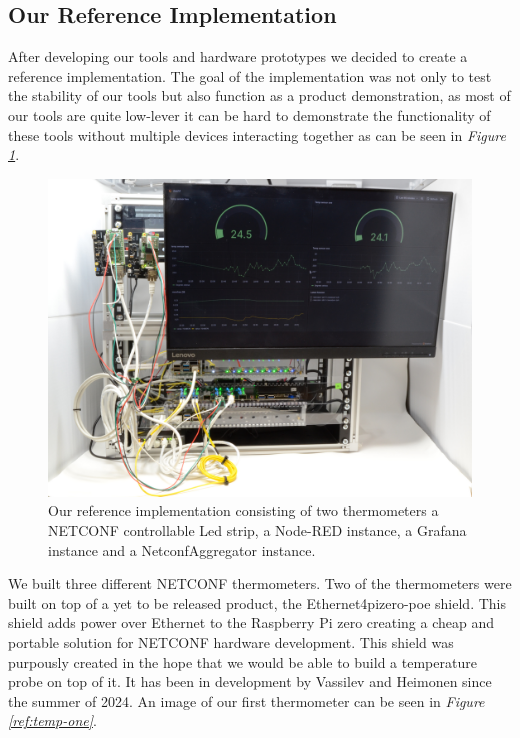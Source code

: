 \documentclass[12pt]{article}
\begin{document}
\newpage

\subsection{Our Reference Implementation}
After developing our tools and hardware prototypes we decided to create a reference implementation.
The goal of the implementation was not only to test the stability of our tools but also function as 
a product demonstration, as most of our tools are quite low-lever it can be hard to demonstrate the 
functionality of these tools without multiple devices interacting together as can be seen in 
\textit{Figure \ref{ref:reference-implementation}}.

\begin{figure}
  \centering
  \includegraphics[width=\textwidth]{setup.jpg}
  \caption{Our reference implementation consisting of two thermometers a NETCONF controllable Led strip, a Node-RED instance, a Grafana instance and a NetconfAggregator instance.}
  \label{ref:reference-implementation}
\end{figure}

\newpage
We built three different NETCONF thermometers. Two of the thermometers were built on top of 
a yet to be released product, the Ethernet4pizero-poe shield. This shield adds 
power over Ethernet to the Raspberry Pi zero creating a cheap and portable solution 
for NETCONF hardware development. This shield was purpously created in the hope that 
we would be able to build a temperature probe on top of it. It has been in development by 
Vassilev and Heimonen since the summer of 2024. An image of our first thermometer can be seen in 
\textit{Figure \ref{ref:temp-one}}.
\end{document}

